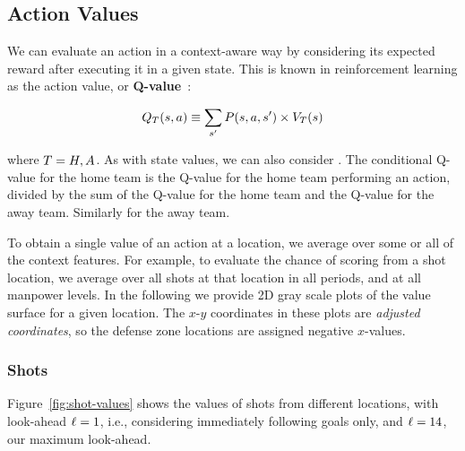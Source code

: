 


\subsection{Action Values}

We can evaluate an action in a context-aware way by considering its expected reward after executing it in a given state. This is known in reinforcement learning as the action value, or \textbf{Q-value}~\citep{bib:sutton}:

\begin{equation} \label{eq:q-value}
Q_{T}(s,a) \equiv \sum_{s'} P(s,a,s') \times V_{T}(s)
\end{equation}

where $T = H,A$.
As with state values, we can also consider . The conditional Q-value for the home team is the Q-value for the home team performing an action, divided by the sum of the Q-value for the home team and the Q-value for the away team. Similarly for the away team. 

To obtain a single value of an action at a location, we average over some or all of the context features.  For example, to evaluate the chance of scoring from a shot location, we average over all shots at that location in all periods, and at all manpower levels. In the following we provide 2D gray scale plots of the value surface for a given location. The $x$-$y$ coordinates in these plots are {\em adjusted coordinates}, so the defense zone locations are assigned negative $x$-values. 

\subsubsection{Shots}

Figure~\ref{fig:shot-values} shows the values of shots from different locations, with look-ahead $\ell = 1$, i.e., considering immediately following goals only, and $\ell = 14$, our maximum look-ahead.


